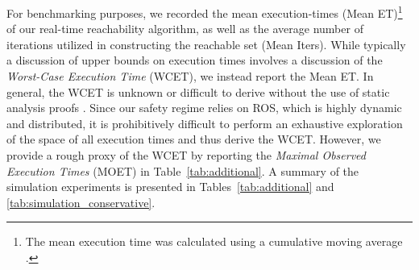 \documentclass[manuscript,screen,review]{acmart}
\begin{document}
For benchmarking purposes, we recorded the mean execution-times (Mean ET)\footnote{The mean execution time was calculated using a cumulative moving average \cite{Jin2019}.} of our real-time reachability algorithm, as well as the average number of iterations utilized in constructing the reachable set (Mean Iters). While typically a discussion of upper bounds on execution times involves a discussion of the \emph{Worst-Case Execution Time} (WCET), we instead report the Mean ET. In general, the WCET is unknown or difficult to derive without the use of static analysis proofs \cite{Reinhard2008}. Since our safety regime relies on ROS, which is highly dynamic and distributed, it is prohibitively difficult to perform an exhaustive exploration of the space of all execution times and thus derive the WCET.  However, we provide a rough proxy of the WCET by reporting the \emph{Maximal Observed Execution Times} (MOET)  \cite{Reinhard2008} in Table~\ref{tab:additional}. %
A summary of the simulation experiments is presented in Tables~\ref{tab:additional} and \ref{tab:simulation_conservative}.
\end{document}
